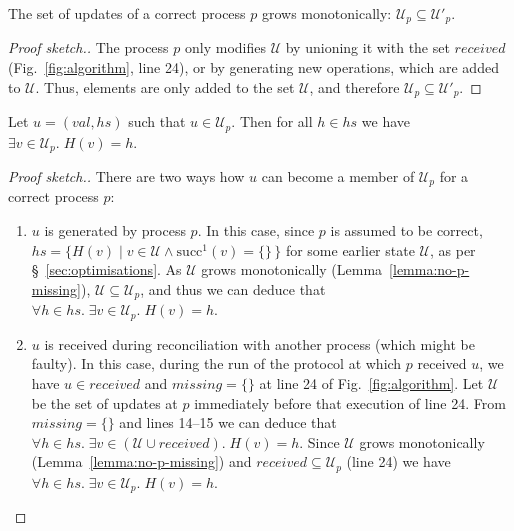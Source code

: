 \documentclass[manuscript,anonymous]{acmart}
\begin{document}
\begin{lemma}\label{lemma:no-p-missing}
The set of updates of a correct process $p$ grows monotonically: $\mathcal{U}_p \subseteq \mathcal{U}'_p$.
\end{lemma}
\begin{proof}[Proof sketch.]
The process $p$ only modifies $\mathcal{U}$ by unioning it with the set $\mathit{received}$ (Fig.~\ref{fig:algorithm}, line 24), or by generating new operations, which are added to $\mathcal{U}$.
Thus, elements are only added to the set $\mathcal{U}$, and therefore $\mathcal{U}_p \subseteq \mathcal{U}'_p$.
\end{proof}

\begin{lemma}\label{lemma:no-dangling}
Let $u = (\mathit{val}, \mathit{hs})$ such that $u \in \mathcal{U}_p$.
Then for all $h \in \mathit{hs}$ we have $\exists v \in \mathcal{U}_p.\; H(v) = h$.
\end{lemma}
\begin{proof}[Proof sketch.]
There are two ways how $u$ can become a member of $\mathcal{U}_p$ for a correct process $p$:
\begin{enumerate}
    \item $u$ is generated by process $p$.
    In this case, since $p$ is assumed to be correct, $\mathit{hs} = \{H(v) \mid v \in \mathcal{U} \wedge \mathrm{succ}^1(v) = \{\}\,\}$ for some earlier state $\mathcal{U}$, as per \S~\ref{sec:optimisations}.
    As $\mathcal{U}$ grows monotonically (Lemma~\ref{lemma:no-p-missing}), $\mathcal{U} \subseteq \mathcal{U}_p$, and thus we can deduce that $\forall h \in \mathit{hs}.\; \exists v \in \mathcal{U}_p.\; H(v) = h$.
    \item $u$ is received during reconciliation with another process (which might be faulty).
    In this case, during the run of the protocol at which $p$ received $u$, we have $u \in \mathit{received}$ and $\mathit{missing} = \{\}$ at line 24 of Fig.~\ref{fig:algorithm}.
    Let $\mathcal{U}$ be the set of updates at $p$ immediately before that execution of line 24.
    From $\mathit{missing} = \{\}$ and lines 14--15 we can deduce that $\forall h \in \mathit{hs}.\; \exists v \in (\mathcal{U} \cup \mathit{received}).\; H(v) = h$.
    Since $\mathcal{U}$ grows monotonically (Lemma~\ref{lemma:no-p-missing}) and $\mathit{received} \subseteq \mathcal{U}_p$ (line 24) we have $\forall h \in \mathit{hs}.\; \exists v \in \mathcal{U}_p.\; H(v) = h$.
\end{enumerate}
\end{proof}
\end{document}
